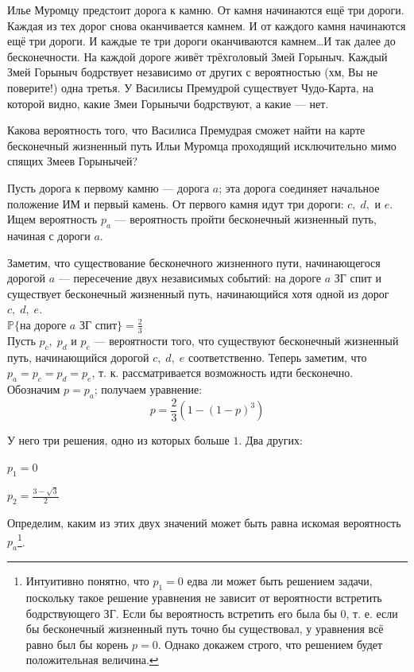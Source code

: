 \documentclass[nobib]{tufte-handout}
\theoremstyle{definition}
\newcounter{problem}
\newenvironment{problem}%
{%
\refstepcounter{problem}%
     \hypertarget{problem:{\theproblem}}{}
     \Writetofile{solution_file}{\protect\hypertarget{soln:\theproblem}{}}
     \begin{myenum}[label=\bfseries\protect\hyperlink{soln:\theproblem}{\theproblem},ref=\theproblem]
     \item%
    }%
    {%
    \end{myenum}}
\renewcommand{\P}{\mathbb{P}}
\begin{document}
\begin{problem}
Илье Муромцу предстоит дорога к камню. От камня начинаются ещё три дороги.
Каждая из тех дорог снова оканчивается камнем.
И от каждого камня начинаются ещё три дороги.
 И каждые те три дороги оканчиваются камнем\ldots И так далее до бесконечности.
 На каждой дороге живёт трёхголовый Змей Горыныч.
 Каждый Змей Горыныч бодрствует независимо от других с вероятностью (хм, Вы не поверите!) одна третья.
 У Василисы Премудрой существует Чудо-Карта, на которой видно,
 какие Змеи Горынычи бодрствуют, а какие — нет.

 Какова вероятность того, что Василиса Премудрая сможет найти на карте
 бесконечный жизненный путь Ильи Муромца проходящий исключительно мимо спящих Змеев Горынычей?


\begin{sol}
Пусть дорога к первому камню — дорога $a$; эта дорога соединяет начальное положение ИМ и первый камень. От первого камня идут три дороги: $c, \; d,\text{ и }e$. Ищем вероятность $p_a$ — вероятность пройти бесконечный жизненный путь, начиная с дороги $a$.

Заметим, что существование бесконечного жизненного пути, начинающегося дорогой $a$ — пересечение двух независимых событий: на дороге $a$ ЗГ спит и существует бесконечный жизненный путь, начинающийся хотя одной из дорог $c, \; d, \; e$.
~\\

$\P \text{\{на дороге } a \text{ ЗГ спит\}} = \frac{2}{3}$
~\\

Пусть $p_c,\; p_d$ и $p_e$ — вероятности того, что существуют бесконечный жизненный путь, начинающийся дорогой $c, \; d, \; e$ соответственно. Теперь заметим, что $p_a=p_c= p_d=p_e$, т. к. рассматривается возможность идти бесконечно. Обозначим $p = p_a$; получаем уравнение:
\[
p = \frac{2}{3}\left(1 - (1-p)^3\right)
\]

У него три решения, одно из которых больше $1$. Два других:
\begin{center}
\begin{minipage}{52mm}
$p_1=0$
\end{minipage}
\hspace{0mm}
\begin{minipage}{22mm}
$p_2=\frac{3 - \sqrt{3}}{2}$
\end{minipage}
\end{center}

Определим, каким из этих двух значений может быть равна искомая вероятность $p_a$\footnote{Интуитивно понятно, что $p_1=0$ едва ли может быть решением задачи, поскольку такое решение уравнения не зависит от вероятности встретить бодрствующего ЗГ. Если бы вероятность встретить его была бы $0$, т. е. если бы бесконечный жизненный путь точно бы существовал, у уравнения всё равно был бы корень $p=0$. Однако докажем строго, что решением будет положительная величина.}.


\end{sol}
\end{problem}
\end{document}
